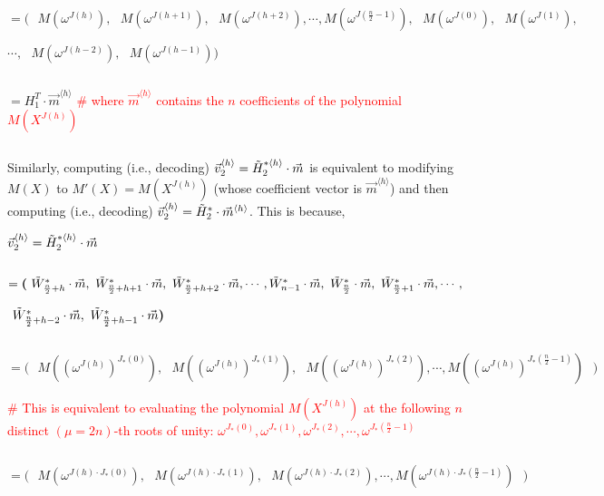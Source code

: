 $ $

$= \bm{(} \text{ } M(\omega^{J(h)}), \text{ } M(\omega^{J(h+1)}), \text{ } M(\omega^{J(h+2)}), \cdots, M(\omega^{J(\frac{n}{2}-1)}), \text{ } M(\omega^{J(0)}), \text{ }M(\omega^{J(1)}),$ 
                                    
$\cdots, \text{ } M(\omega^{J(h-2)}), \text{ } M(\omega^{J(h-1)})  \bm{)}$ 

$ $

$= H_1^{T}\cdot \vec{m}^{\langle h \rangle}$ \textcolor{red}{ \text{ } \# where $\vec{m}^{\langle h \rangle}$ contains the $n$ coefficients of the polynomial $M(X^{J(h)})$ }


$ $

Similarly, computing (i.e., decoding) $\vec{v}_2^{\langle h \rangle} = \tilde{H}_2^{*\langle h \rangle}\cdot \vec{m}$ is equivalent to modifying $M(X)$ to $M'(X) = M(X^{J(h)})$ (whose coefficient vector is $\vec{m}^{\langle h \rangle}$) and then computing (i.e., decoding) $\vec{v}_2^{\langle h \rangle} = \tilde{H}_2^{*}\cdot \vec{m}^{\langle h \rangle}$. This is because,

$\vec{v}_2^{\langle h \rangle} =\tilde{H}_2^{*\langle h \rangle}\cdot \vec{m}$

$ $


$ = \bm{(} \text{ } \tilde{W}^*_{\frac{n}{2} +h}\cdot\vec{m}, \text{ } \tilde{W}^*_{\frac{n}{2} + h+1}\cdot\vec{m}, \text{ } \tilde{W}^*_{\frac{n}{2} +h+2}\cdot\vec{m}, \cdots, \tilde{W}^*_{n -1}\cdot\vec{m}, \text{ } \tilde{W}^*_{\frac{n}{2}}\cdot\vec{m}, \text{ }\tilde{W}^*_{\frac{n}{2} + 1}\cdot\vec{m}, \cdots,$

\text{ }\text{ }\text{ }\text{ }$ \text{ } \tilde{W}^*_{\frac{n}{2} + h-2}\cdot\vec{m}, \text{ } \tilde{W}^*_{\frac{n}{2} + h-1}\cdot\vec{m}  \bm{)}$

$ $

$= \bm{(} \text{ } M((\omega^{J(h)})^{J_*(0)}), \text{ } M((\omega^{J(h)})^{J_*(1)}), \text{ } M((\omega^{J(h)})^{J_*(2)}), \cdots, M((\omega^{J(h)})^{J_*(\frac{n}{2}-1)}) \text{ } \bm{)}$


\textcolor{red}{\# This is equivalent to evaluating the polynomial $M(X^{J(h)})$ at the following $n$ distinct $(\mu=2n)$-th roots of unity: $\omega^{J_*(0)}, \omega^{J_*(1)},  \omega^{J_*(2)}, \cdots, \omega^{J_*(\frac{n}{2} - 1)}$}

$ $

$= \bm{(} \text{ } M(\omega^{J(h)\cdot J_*(0)}), \text{ } M(\omega^{J(h)\cdot J_*(1)}), \text{ } M(\omega^{J(h)\cdot J_*(2)}), \cdots, M(\omega^{J(h)\cdot J_*(\frac{n}{2}-1)}) \text{ } \bm{)}$

